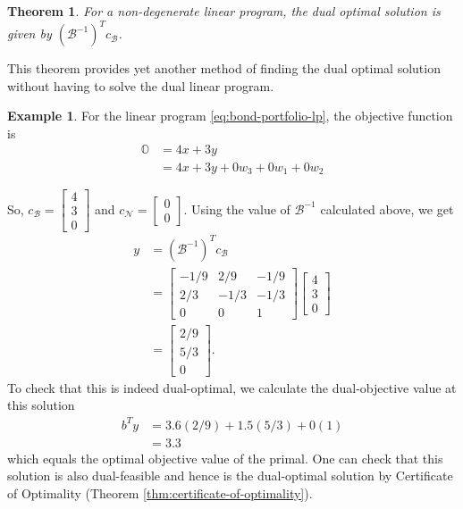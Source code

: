 \documentclass[
]{book}
\newtheorem{theorem}{Theorem}[chapter]
\theoremstyle{definition}
\theoremstyle{definition}
\newtheorem{example}{Example}[chapter]
\theoremstyle{definition}
\theoremstyle{definition}
\theoremstyle{remark}
\begin{document}
\begin{theorem}
\protect\hypertarget{thm:dual-solution}{}\label{thm:dual-solution}For a non-degenerate linear program, the dual optimal solution is given by \((\mathcal{B}^{-1})^Tc_{\mathcal{B}}\).
\end{theorem}

This theorem provides yet another method of finding the dual optimal solution without having to solve the dual linear program.

\begin{example}
\protect\hypertarget{exm:dual-solution}{}\label{exm:dual-solution}For the linear program \eqref{eq:bond-portfolio-lp}, the objective function is
\begin{align*}
  \mathbb{O} & = 4 x + 3y \\
  & = 4x + 3y + 0 w_3 + 0 w_1 + 0 w_2 
\end{align*}

So, \(c_{\mathcal{B}} = \begin{bmatrix}4 \\ 3 \\ 0 \end{bmatrix}\) and \(c_{\mathcal{N}} = \begin{bmatrix}0 \\ 0 \end{bmatrix}\).
Using the value of \(\mathcal{B}^{-1}\) calculated above, we get
\begin{align*}
  y & = (\mathcal{B}^{-1})^Tc_{\mathcal{B}} \\
  & = 
    \begin{bmatrix}
    -1/9 & 2/9 & -1/9 \\
    2/3 & -1/3 & -1/3 \\
    0 & 0 & 1
    \end{bmatrix} 
    \begin{bmatrix}
      4 \\ 3 \\ 0
    \end{bmatrix}\\
  & = 
  \begin{bmatrix}
    2/9 \\ 5/3 \\ 0
  \end{bmatrix}.
\end{align*}
To check that this is indeed dual-optimal, we calculate the dual-objective value at this solution
\begin{align*}
  b^T y & = 3.6 (2/9) + 1.5 (5/3) + 0 (1) \\
  &= 3.3
\end{align*}
which equals the optimal objective value of the primal. One can check that this solution is also dual-feasible and hence is the dual-optimal solution by Certificate of Optimality (Theorem \ref{thm:certificate-of-optimality}).
\end{example}
\end{document}
